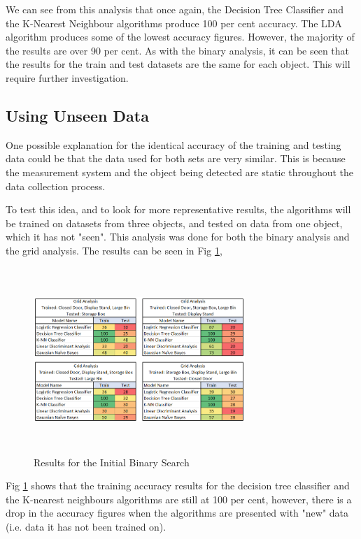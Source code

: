 \documentclass[conference]{IEEEtran}
\begin{document}
We can see from this analysis that once again, the Decision Tree Classifier and the K-Nearest Neighbour algorithms produce 100 per cent accuracy.  The LDA algorithm produces some of the lowest accuracy figures. However, the majority of the results are over 90 per cent. As with the binary analysis, it can be seen that the results for the train and test datasets are the same for each object. This will require further investigation.

\subsection{Using Unseen Data}
One possible explanation for the identical accuracy of the training and testing data could be that the data used for both sets are very similar. This is because the measurement system and the object being detected are static throughout the data collection process. 

To test this idea, and to look for more representative results, the algorithms will be trained on datasets from three objects, and tested on data from one object, which it has not "seen". This analysis was done for both the binary analysis and the grid analysis. The results can be seen in Fig \ref{fig:new_data_results},

\begin{figure}[h]
\includegraphics[width=8cm, height=7cm]{images/new_data_results.png}
\centering
\caption{Results for the Initial Binary Search}
\label{fig:new_data_results}
\end{figure}

Fig \ref{fig:new_data_results} shows that the training accuracy results for the decision tree classifier and the K-nearest neighbours algorithms are still at 100 per cent, however, there is a drop in the accuracy figures when the algorithms are presented with "new" data (i.e. data it has not been trained on).
\end{document}
